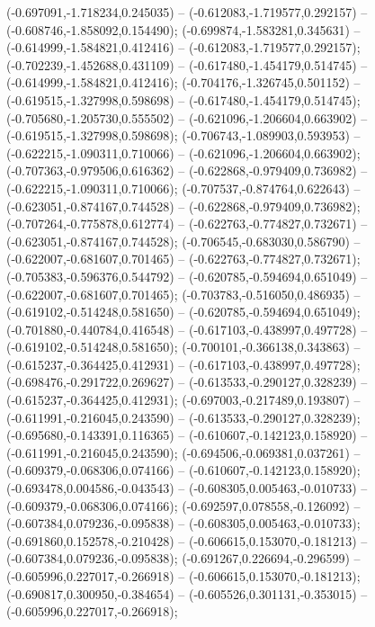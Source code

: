  (-0.697091,-1.718234,0.245035) -- (-0.612083,-1.719577,0.292157) -- (-0.608746,-1.858092,0.154490);
 (-0.699874,-1.583281,0.345631) -- (-0.614999,-1.584821,0.412416) -- (-0.612083,-1.719577,0.292157);
 (-0.702239,-1.452688,0.431109) -- (-0.617480,-1.454179,0.514745) -- (-0.614999,-1.584821,0.412416);
 (-0.704176,-1.326745,0.501152) -- (-0.619515,-1.327998,0.598698) -- (-0.617480,-1.454179,0.514745);
 (-0.705680,-1.205730,0.555502) -- (-0.621096,-1.206604,0.663902) -- (-0.619515,-1.327998,0.598698);
 (-0.706743,-1.089903,0.593953) -- (-0.622215,-1.090311,0.710066) -- (-0.621096,-1.206604,0.663902);
 (-0.707363,-0.979506,0.616362) -- (-0.622868,-0.979409,0.736982) -- (-0.622215,-1.090311,0.710066);
 (-0.707537,-0.874764,0.622643) -- (-0.623051,-0.874167,0.744528) -- (-0.622868,-0.979409,0.736982);
 (-0.707264,-0.775878,0.612774) -- (-0.622763,-0.774827,0.732671) -- (-0.623051,-0.874167,0.744528);
 (-0.706545,-0.683030,0.586790) -- (-0.622007,-0.681607,0.701465) -- (-0.622763,-0.774827,0.732671);
 (-0.705383,-0.596376,0.544792) -- (-0.620785,-0.594694,0.651049) -- (-0.622007,-0.681607,0.701465);
 (-0.703783,-0.516050,0.486935) -- (-0.619102,-0.514248,0.581650) -- (-0.620785,-0.594694,0.651049);
 (-0.701880,-0.440784,0.416548) -- (-0.617103,-0.438997,0.497728) -- (-0.619102,-0.514248,0.581650);
 (-0.700101,-0.366138,0.343863) -- (-0.615237,-0.364425,0.412931) -- (-0.617103,-0.438997,0.497728);
 (-0.698476,-0.291722,0.269627) -- (-0.613533,-0.290127,0.328239) -- (-0.615237,-0.364425,0.412931);
 (-0.697003,-0.217489,0.193807) -- (-0.611991,-0.216045,0.243590) -- (-0.613533,-0.290127,0.328239);
 (-0.695680,-0.143391,0.116365) -- (-0.610607,-0.142123,0.158920) -- (-0.611991,-0.216045,0.243590);
 (-0.694506,-0.069381,0.037261) -- (-0.609379,-0.068306,0.074166) -- (-0.610607,-0.142123,0.158920);
 (-0.693478,0.004586,-0.043543) -- (-0.608305,0.005463,-0.010733) -- (-0.609379,-0.068306,0.074166);
 (-0.692597,0.078558,-0.126092) -- (-0.607384,0.079236,-0.095838) -- (-0.608305,0.005463,-0.010733);
 (-0.691860,0.152578,-0.210428) -- (-0.606615,0.153070,-0.181213) -- (-0.607384,0.079236,-0.095838);
 (-0.691267,0.226694,-0.296599) -- (-0.605996,0.227017,-0.266918) -- (-0.606615,0.153070,-0.181213);
 (-0.690817,0.300950,-0.384654) -- (-0.605526,0.301131,-0.353015) -- (-0.605996,0.227017,-0.266918);
